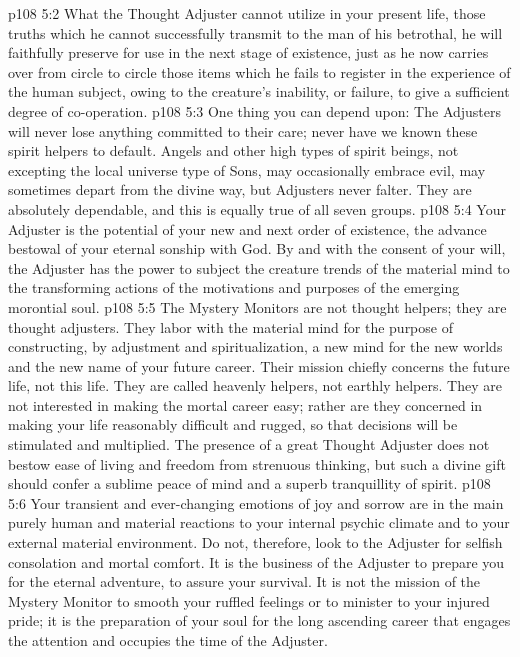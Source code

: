 \vs p108 5:2 What the Thought Adjuster cannot utilize in your present life, those truths which he cannot successfully transmit to the man of his betrothal, he will faithfully preserve for use in the next stage of existence, just as he now carries over from circle to circle those items which he fails to register in the experience of the human subject, owing to the creature’s inability, or failure, to give a sufficient degree of co\hyp{}operation.
\vs p108 5:3 One thing you can depend upon: The Adjusters will never lose anything committed to their care; never have we known these spirit helpers to default. Angels and other high types of spirit beings, not excepting the local universe type of Sons, may occasionally embrace evil, may sometimes depart from the divine way, but Adjusters never falter. They are absolutely dependable, and this is equally true of all seven groups.
\vs p108 5:4 \pc Your Adjuster is the potential of your new and next order of existence, the advance bestowal of your eternal sonship with God. By and with the consent of your will, the Adjuster has the power to subject the creature trends of the material mind to the transforming actions of the motivations and purposes of the emerging morontial soul.
\vs p108 5:5 The Mystery Monitors are not thought helpers; they are thought adjusters. They labor with the material mind for the purpose of constructing, by adjustment and spiritualization, a new mind for the new worlds and the new name of your future career. Their mission chiefly concerns the future life, not this life. They are called heavenly helpers, not earthly helpers. They are not interested in making the mortal career easy; rather are they concerned in making your life reasonably difficult and rugged, so that decisions will be stimulated and multiplied. The presence of a great Thought Adjuster does not bestow ease of living and freedom from strenuous thinking, but such a divine gift should confer a sublime peace of mind and a superb tranquillity of spirit.
\vs p108 5:6 Your transient and ever\hyp{}changing emotions of joy and sorrow are in the main purely human and material reactions to your internal psychic climate and to your external material environment. Do not, therefore, look to the Adjuster for selfish consolation and mortal comfort. It is the business of the Adjuster to prepare you for the eternal adventure, to assure your survival. It is not the mission of the Mystery Monitor to smooth your ruffled feelings or to minister to your injured pride; it is the preparation of your soul for the long ascending career that engages the attention and occupies the time of the Adjuster.

